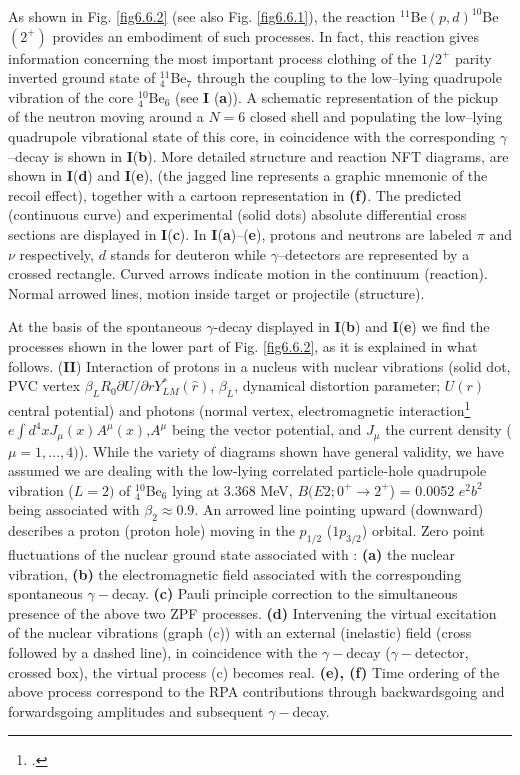 As shown in Fig. \ref{fig6.6.2} (see also Fig. \ref{fig6.6.1}), the reaction $^{11}$Be$(p,d)^{10}$Be$(2^+)$ provides an embodiment of such processes.  	 In fact, this reaction gives information concerning the most important process   clothing  of the $1/2^+$ parity inverted ground state of $^{11}_4$Be$_{7}$
  	through the coupling to the low--lying quadrupole vibration of the core $^{10}_4$Be$_6$ (see \textbf{I} (\textbf{a})). A schematic representation 
  	of the pickup of the neutron moving around a $N=6$ closed shell and populating the low--lying
  	quadrupole vibrational state of this core, in coincidence with the corresponding $\gamma$--decay is shown in \textbf{I}(\textbf{b}).  More  detailed structure and reaction NFT diagrams,  
  are	shown in  \textbf{I}(\textbf{d}) and \textbf{I}(\textbf{e}), (the jagged line represents 
  	  	a graphic mnemonic of the recoil effect),  together with a cartoon representation in {\bf (f)}. The predicted (continuous curve) and experimental
  	  	  	(solid dots) absolute differential cross sections   are displayed in \textbf{I}(\textbf{c}).
  In \textbf{I}(\textbf{a})--(\textbf{e}),	protons 
  	and neutrons are labeled $\pi$ and $\nu$ respectively,  $d$ stands for deuteron while $\gamma$--detectors are represented by a crossed rectangle.
  	Curved arrows indicate  motion in the continuum (reaction). Normal arrowed 
  	lines, motion inside target or projectile (structure).  
  	
  	
  	At the basis of the spontaneous $\gamma$-decay displayed in \textbf{I}(\textbf{b}) and \textbf{I}(\textbf{e}) we find the processes shown in the lower part of Fig. \ref{fig6.6.2}, as it is explained in what follows. (\textbf{II}) Interaction of protons in a nucleus with nuclear vibrations (solid dot, PVC vertex 
  	$\beta_L R_0  \partial U/\partial r Y_{LM}^*(\hat r)$, $\beta_L$, dynamical
  	distortion parameter; $U(r)$ central potential) and photons (normal vertex, 
  	electromagnetic 
  	interaction\footnote{\cite{Holstein:89}.} $e \int d^4 x J_{\mu}(x) A^{\mu} (x)$,$A^{\mu}$ being 
  	the vector potential, and $J_{\mu}$ the current density ($\mu=1,...,4)$).
  	While the variety of diagrams shown have general validity, we have assumed
  	we are dealing with the low-lying correlated particle-hole quadrupole vibration 
  	($L=2)$ of $^{10}_4$Be$_6$ lying at 3.368 MeV,  $B(E2; 0^+ \to 2^+$) = 0.0052 $e^2 b^2$ being
  	associated with $\beta_2 \approx 0.9$. An arrowed line pointing  upward (downward) 
  	describes a proton (proton hole) moving in the $p_{1/2}$ ($1p_{3/2}$) orbital. 
  	Zero point fluctuations of the nuclear ground state associated with : {\bf (a)} the nuclear
  	vibration, {\bf (b)} the electromagnetic field associated with the corresponding spontaneous
  	$\gamma-$decay.   {\bf (c)} Pauli principle correction to the simultaneous presence 
  	of the above two ZPF processes. {\bf (d)} Intervening the virtual excitation of the nuclear vibrations 
  	(graph (c)) with an external (inelastic) field  (cross followed by a dashed line), in coincidence with the $\gamma-$decay 
  	($\gamma-$detector, crossed box), the virtual process (c) becomes real. {\bf (e), (f)}  Time ordering of the 
  	above process correspond to the  RPA contributions through backwardsgoing and forwardsgoing amplitudes
  	and subsequent $\gamma-$decay.
